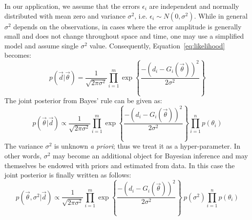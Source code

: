 In our application, we assume that the errors $\epsilon_i$ are independent
and normally distributed with mean
zero and variance $\sigma^2$, i.e. 
$\epsilon_i \sim N(0,\sigma^2)$. 
While in general $\sigma^2$ depends on the observations, in cases where the error
amplitude is generally small and does not change throughout space and time, one may use
a simplified model and assume single $\sigma^2$ value.
Consequently, Equation~\eqref{eq:likelihood} becomes:
\begin{equation} 
p(\vec d |  \vec{\theta}) 
= 
\frac{1}{\sqrt{2 \pi \sigma^2}}\prod_{i=1}^m   
\exp \left\lbrace \frac{-(d_i - G_i(\vec \theta))^2}{2 \sigma^2} \right\rbrace 	
\label{eq:likelihood2}
\end{equation}
The joint posterior from Bayes' rule can be given as:
\begin{equation} 
p(\vec{\theta}| \vec d)
\propto
\frac{1}{\sqrt{2 \pi \sigma^2}}   \prod_{i=1}^m  
\exp \left\lbrace \frac{-(d_i - G_i(\vec \theta))^2}{2 \sigma^2} \right\rbrace  
\prod_{i=1}^n p(\theta_i)
\end{equation}
The variance $\sigma^2$ is unknown \emph{a priori}; thus we treat it as a hyper-parameter.
In other words, $\sigma^2$ may become an additional object for Bayesian inference and may themselves be endowed with priors and estimated from data. In this case the joint posterior is finally written as follows:
\begin{equation} 
p(\vec{\theta},\sigma^2 | \vec d)
\propto
\frac{1}{\sqrt{2 \pi \sigma^2}}   \prod_{i=1}^m  
\exp \left\lbrace \frac{-(d_i - G_i(\vec \theta))^2}{2 \sigma^2} \right\rbrace
\ p(\sigma^2) \prod_{i=1}^n p(\theta_i)
\label{eq:post}
\end{equation}

